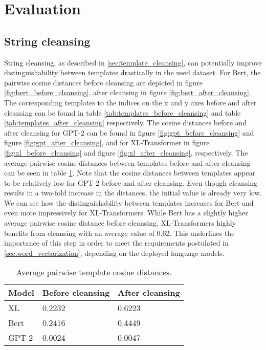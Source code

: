 \section{Evaluation}
\subsection{String cleansing}
String cleansing, as described in \ref{sec:template_cleansing}, can potentially  improve distinguishability between templates drastically in the used dataset.
For Bert, the pairwise cosine distances before cleansing are depicted in figure \ref{fig:bert_before_cleansing}, after cleansing in figure \ref{fig:bert_after_cleansing}. The corresponding templates to the indices on the x and y axes before and after cleansing can be found in table \ref{tab:templates_before_cleansing} and table \ref{tab:templates_after_cleansing} respectively.
The cosine distances before and after cleansing for GPT-2 can be found in figure \ref{fig:gpt_before_cleansing} and figure \ref{fig:gpt_after_cleansing}, and for XL-Transformer in figure \ref{fig:xl_before_cleansing} and figure \ref{fig:xl_after_cleansing}, respectively. The average pairwise cosine distances between templates before and after cleansing can be seen in table \ref{tab:average_pairwise_cos_distances}.
Note that the cosine distances between templates appear to be relatively low for GPT-2 before and after cleansing. Even though cleansing results in a two-fold increase in the distances, the initial value is already very low. We can see how the distinguishability between templates increases for Bert and even more impressively for XL-Transformers. While Bert has a slightly higher average pairwise cosine distance before cleansing, XL-Transformers highly benefits from cleansing with an average value of 0.62. This underlines the importance of this step in order to meet the requirements postulated in \ref{sec:word_vectorization}, depending on the deployed language models.



\begin{table}[ht]
\centering
\begin{small}
\begin{tabular}{ p{1.3cm} p{2.5cm} p{2.5cm} }
\toprule
Model & Before cleansing & After cleansing\\
\midrule
XL & 0.2232 & 0.6223\\
Bert & 0.2416 & 0.4449\\
GPT-2 & 0.0024 & 0.0047 \\ 

\bottomrule
\end{tabular}
\caption{Average pairwise template cosine distances.}
\label{tab:average_pairwise_cos_distances}
\end{small}
\end{table}


